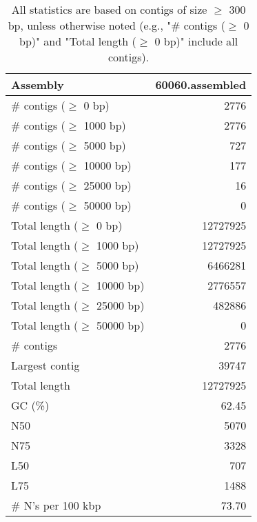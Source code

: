 \documentclass[12pt,a4paper]{article}
\begin{document}
\begin{table}[ht]
\begin{center}
\caption{All statistics are based on contigs of size $\geq$ 300 bp, unless otherwise noted (e.g., "\# contigs ($\geq$ 0 bp)" and "Total length ($\geq$ 0 bp)" include all contigs).}
\begin{tabular}{|l*{1}{|r}|}
\hline
Assembly & 60060.assembled \\ \hline
\# contigs ($\geq$ 0 bp) & 2776 \\ \hline
\# contigs ($\geq$ 1000 bp) & 2776 \\ \hline
\# contigs ($\geq$ 5000 bp) & 727 \\ \hline
\# contigs ($\geq$ 10000 bp) & 177 \\ \hline
\# contigs ($\geq$ 25000 bp) & 16 \\ \hline
\# contigs ($\geq$ 50000 bp) & 0 \\ \hline
Total length ($\geq$ 0 bp) & 12727925 \\ \hline
Total length ($\geq$ 1000 bp) & 12727925 \\ \hline
Total length ($\geq$ 5000 bp) & 6466281 \\ \hline
Total length ($\geq$ 10000 bp) & 2776557 \\ \hline
Total length ($\geq$ 25000 bp) & 482886 \\ \hline
Total length ($\geq$ 50000 bp) & 0 \\ \hline
\# contigs & 2776 \\ \hline
Largest contig & 39747 \\ \hline
Total length & 12727925 \\ \hline
GC (\%) & 62.45 \\ \hline
N50 & 5070 \\ \hline
N75 & 3328 \\ \hline
L50 & 707 \\ \hline
L75 & 1488 \\ \hline
\# N's per 100 kbp & 73.70 \\ \hline
\end{tabular}
\end{center}
\end{table}
\end{document}
